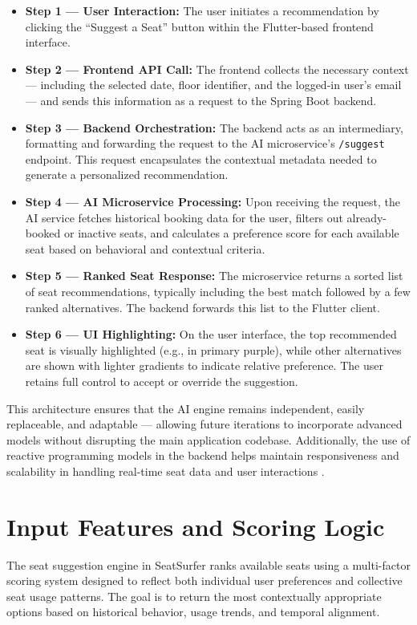 \documentclass[12pt,a4paper]{report} %
\begin{document}
\begin{itemize}
\item \textbf{Step 1 — User Interaction:}
The user initiates a recommendation by clicking the “Suggest a Seat” button within the Flutter-based frontend interface.
\item \textbf{Step 2 — Frontend API Call:}  
The frontend collects the necessary context — including the selected date, floor identifier, and the logged-in user's email — and sends this information as a request to the Spring Boot backend.
\item \textbf{Step 3 — Backend Orchestration:}  
The backend acts as an intermediary, formatting and forwarding the request to the AI microservice's \texttt{/suggest} endpoint. This request encapsulates the contextual metadata needed to generate a personalized recommendation.
\item \textbf{Step 4 — AI Microservice Processing:}  
Upon receiving the request, the AI service fetches historical booking data for the user, filters out already-booked or inactive seats, and calculates a preference score for each available seat based on behavioral and contextual criteria.
\item \textbf{Step 5 — Ranked Seat Response:}  
The microservice returns a sorted list of seat recommendations, typically including the best match followed by a few ranked alternatives. The backend forwards this list to the Flutter client.
\item \textbf{Step 6 — UI Highlighting:}  
On the user interface, the top recommended seat is visually highlighted (e.g., in primary purple), while other alternatives are shown with lighter gradients to indicate relative preference. The user retains full control to accept or override the suggestion.
\end{itemize}

This architecture ensures that the AI engine remains independent, easily replaceable, and adaptable — allowing future iterations to incorporate advanced models without disrupting the main application codebase. Additionally, the use of reactive programming models in the backend helps maintain responsiveness and scalability in handling real-time seat data and user interactions \cite{huang2023reactive}.

\section{Input Features and Scoring Logic}

The seat suggestion engine in SeatSurfer ranks available seats using a multi-factor scoring system designed to reflect both individual user preferences and collective seat usage patterns. The goal is to return the most contextually appropriate options based on historical behavior, usage trends, and temporal alignment.
\end{document}
